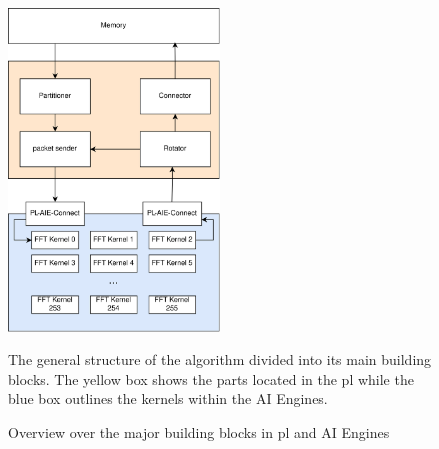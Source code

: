 \begin{figure}[h]
    \centering
    \includegraphics[width=0.5\textwidth]{images/overview.png}
    \captionsetup{justification=centering}
    \caption{Overview over the major building blocks in \ac{pl} and AI Engines}
        The general structure of the algorithm divided into its main building blocks. The yellow box shows the parts located in the \ac{pl} while the blue box outlines the kernels within the AI Engines.
    \label{fig:overview}
\end{figure}

